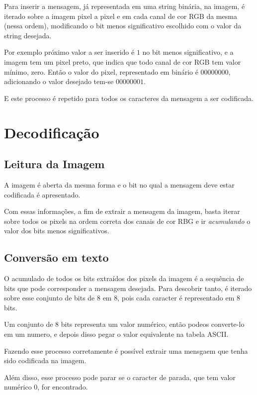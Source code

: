 \documentclass[conference]{IEEEtran}
\begin{document}
    Para inserir a mensagem, já representada em uma string binária, na imagem, é iterado sobre a imagem pixel a pixel e em cada canal de cor RGB da mesma (nessa ordem), modificando o bit menos significativo escolhido com o valor da string desejada.

    Por exemplo próximo valor a ser inserido é $1$ no bit menos significativo, e a imagem tem um pixel preto, que indica que todo canal de cor RGB tem valor mínimo, zero.
    Então o valor do pixel, representado em binário é $00000000$, adicionando o valor desejado tem-se $00000001$.

    E este processo é repetido para todos os caracteres da mensagem a ser codificada.


\section {Decodificação}

    \subsection{Leitura da Imagem}

    A imagem é aberta da mesma forma e o bit no qual a mensagem deve estar codificada é apresentado.

    Com essas informações, a fim de extrair a mensagem da imagem, basta iterar sobre todos os pixels na ordem correta dos canais de cor RBG e ir \textit{acumulando} o valor dos bits menos significativos.

    \subsection{Conversão em texto}

    O acumulado de todos os bits extraídos dos pixels da imagem é a sequência de bits que pode corresponder a mensagem desejada.
    Para descobrir tanto, é iterado sobre esse conjunto de bits de 8 em 8, pois cada caracter é representado em 8 bits.

    Um conjunto de 8 bits representa um valor numérico, então podeos converte-lo em um numero, e depois disso pegar o valor equivalente na tabela ASCII.

    Fazendo esse processo corretamente é possível extrair uma mensgaem que tenha sido codificada na imagem.

    Além disso, esse processo pode parar se o caracter de parada, que tem valor numérico $0$, for encontrado.
\end{document}

